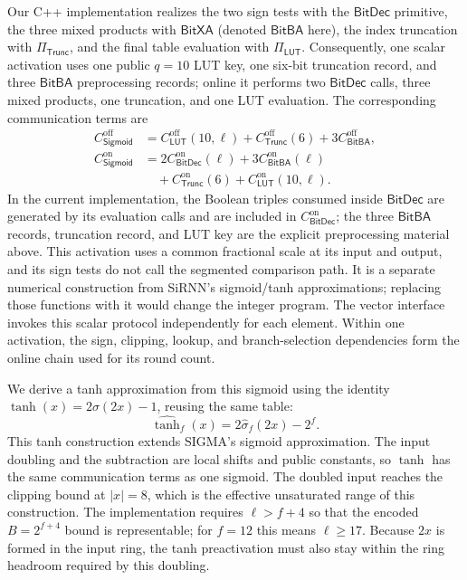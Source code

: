 \documentclass[journal]{IEEEtran}
\theoremstyle{definition}
\theoremstyle{plain}
\newcommand{\BitBA}{\mathsf{BitBA}}
\begin{document}
Our C++ implementation realizes the two sign tests with the
$\textsf{BitDec}$ primitive, the three mixed products with
$\textsf{BitXA}$ (denoted $\BitBA$ here), the index truncation with
$\Pi_{\mathsf{Trunc}}$, and the final table evaluation with
$\Pi_{\mathsf{LUT}}$. Consequently, one scalar activation uses one public
$q=10$ LUT key, one six-bit truncation record, and three $\BitBA$ preprocessing
records; online it performs two $\textsf{BitDec}$ calls, three mixed products,
one truncation, and one LUT evaluation. The corresponding communication terms are
\begin{equation}
\begin{aligned}
C^{\mathrm{off}}_{\mathsf{Sigmoid}}
 &= C^{\mathrm{off}}_{\mathsf{LUT}}(10,\ell)
  + C^{\mathrm{off}}_{\mathsf{Trunc}}(6)
  + 3C^{\mathrm{off}}_{\BitBA},\\
C^{\mathrm{on}}_{\mathsf{Sigmoid}}
 &= 2C^{\mathrm{on}}_{\textsf{BitDec}}(\ell)
  + 3C^{\mathrm{on}}_{\BitBA}(\ell)\\
 &\quad+ C^{\mathrm{on}}_{\mathsf{Trunc}}(6)
  + C^{\mathrm{on}}_{\mathsf{LUT}}(10,\ell).
\end{aligned}
\label{eq:sigmoid-cost}
\end{equation}
In the current implementation, the Boolean triples consumed inside
$\textsf{BitDec}$ are generated by its evaluation calls and are included in
$C^{\mathrm{on}}_{\textsf{BitDec}}$; the three $\BitBA$ records, truncation record,
and LUT key are the explicit preprocessing material above.
This activation uses a common fractional scale at its input and output, and its
sign tests do not call the segmented comparison path. It is a separate numerical
construction from SiRNN's sigmoid/tanh approximations; replacing those functions
with it would change the integer program.
The vector interface invokes this scalar protocol independently for each
element. Within one activation, the sign, clipping, lookup, and branch-selection
dependencies form the online chain used for its round count.

We derive a tanh approximation from this sigmoid using the identity
$\tanh(x)=2\sigma(2x)-1$, reusing the same table:
\begin{equation}
  \widehat{\tanh}_f(x)=2\widehat\sigma_f(2x)-2^f.
  \label{eq:tanh-cost}
\end{equation}
This tanh construction extends SIGMA's sigmoid approximation.
The input doubling and the subtraction are local shifts and public constants,
so $\tanh$ has the same communication terms as one sigmoid. The doubled input
reaches the clipping bound at $|x|=8$, which is the effective unsaturated range
of this construction. The implementation requires $\ell>f+4$ so that the
encoded $B=2^{f+4}$ bound is representable; for $f=12$ this means
$\ell\geq17$. Because $2x$ is formed in the input ring, the tanh preactivation
must also stay within the ring headroom required by this doubling.
\end{document}
